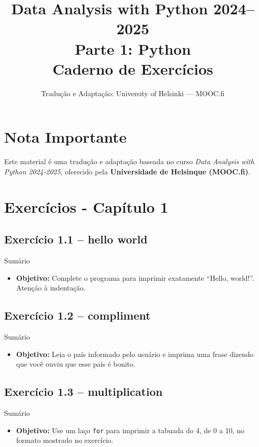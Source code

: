 \documentclass[11pt,a4paper]{article}
\title{\textbf{Data Analysis with Python 2024--2025}\\Parte 1: Python\\\large Caderno de Exercícios}
\author{Tradução e Adaptação: University of Helsinki --- MOOC.fi}
\date{}
\begin{document}
\maketitle

\section*{Nota Importante}
Este material é uma tradução e adaptação baseada no curso \textit{Data Analysis with Python 2024-2025}, oferecido pela \textbf{Universidade de Helsinque (MOOC.fi)}.

\tableofcontents
\newpage

\section{Exercícios - Capítulo 1}

\subsection*{Exercício 1.1 -- hello world}
\begin{exercicio}{Sumário}
\begin{itemize}
    \item \textbf{Objetivo:} Complete o programa para imprimir exatamente ``Hello, world!''. Atenção à indentação.
\end{itemize}
\end{exercicio}

\subsection*{Exercício 1.2 -- compliment}
\begin{exercicio}{Sumário}
\begin{itemize}
    \item \textbf{Objetivo:} Leia o país informado pelo usuário e imprima uma frase dizendo que você ouviu que esse país é bonito.
\end{itemize}
\end{exercicio}

\subsection*{Exercício 1.3 -- multiplication}
\begin{exercicio}{Sumário}
\begin{itemize}
    \item \textbf{Objetivo:} Use um laço \texttt{for} para imprimir a tabuada do 4, de 0 a 10, no formato mostrado no exercício.
\end{itemize}
\end{exercicio}
\end{document}
